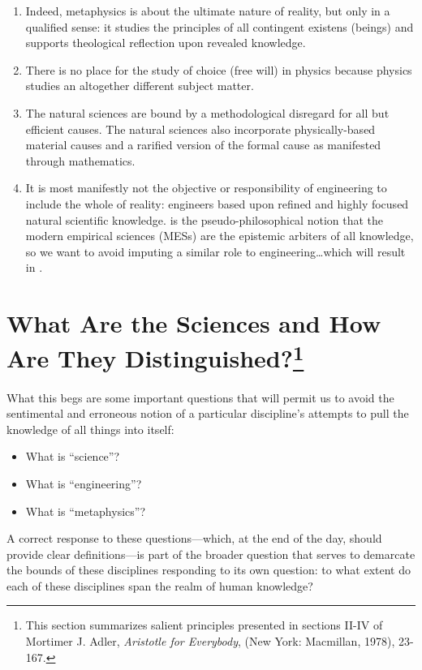 \begin{enumerate}
\item Indeed, metaphysics is about the ultimate nature of reality, but only in a qualified sense: it studies the principles of all contingent existens (beings) and supports theological reflection upon revealed knowledge.
\item There is no place for the study of choice (free will) in physics because physics studies an altogether different subject matter.
\item The natural sciences are  bound by a methodological disregard for all but efficient causes. The natural sciences also incorporate physically-based material causes and a rarified version of the formal cause as manifested through mathematics.
\item It is most manifestly not the objective or responsibility of engineering to include the whole of reality: engineers  based upon refined and highly focused natural scientific knowledge.  is the pseudo-philosophical notion that the modern empirical sciences (MESs) are the epistemic arbiters of all knowledge, so we want to avoid imputing a similar role to engineering\ldots which will result in .
\end{enumerate}

\section{What Are the Sciences and How Are They Distinguished?\footnote{This section summarizes salient principles presented in sections II-IV of Mortimer J. Adler, \textit{Aristotle for Everybody}, (New York: Macmillan, 1978), 23-167.}}

What this begs are some important questions that will permit us to avoid the sentimental and erroneous notion of a particular discipline's attempts to pull the knowledge of all things into itself:

\begin{itemize}
\item What is ``science''?
\item What is ``engineering''?
\item What is ``metaphysics''?
\end{itemize}

A correct response to these questions---which, at the end of the day, should provide clear definitions---is part of the broader question that serves to demarcate the bounds of these disciplines responding to its own question: to what extent do each of these disciplines span the realm of human knowledge?


